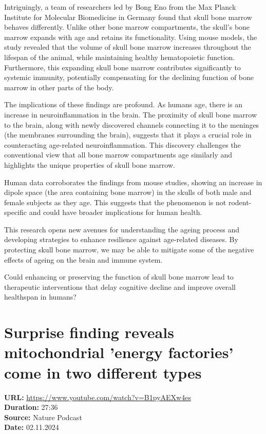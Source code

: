 \documentclass[12pt]{article}
\begin{document}
Intriguingly, a team of researchers led by Bong Eno from the Max Planck Institute for Molecular Biomedicine in Germany found that skull bone marrow behaves differently. Unlike other bone marrow compartments, the skull's bone marrow expands with age and retains its functionality. Using mouse models, the study revealed that the volume of skull bone marrow increases throughout the lifespan of the animal, while maintaining healthy hematopoietic function. Furthermore, this expanding skull bone marrow contributes significantly to systemic immunity, potentially compensating for the declining function of bone marrow in other parts of the body.

The implications of these findings are profound. As humans age, there is an increase in neuroinflammation in the brain. The proximity of skull bone marrow to the brain, along with newly discovered channels connecting it to the meninges (the membranes surrounding the brain), suggests that it plays a crucial role in counteracting age-related neuroinflammation. This discovery challenges the conventional view that all bone marrow compartments age similarly and highlights the unique properties of skull bone marrow.

Human data corroborates the findings from mouse studies, showing an increase in dipole space (the area containing bone marrow) in the skulls of both male and female subjects as they age. This suggests that the phenomenon is not rodent-specific and could have broader implications for human health.

This research opens new avenues for understanding the ageing process and developing strategies to enhance resilience against age-related diseases. By protecting skull bone marrow, we may be able to mitigate some of the negative effects of ageing on the brain and immune system.

Could enhancing or preserving the function of skull bone marrow lead to therapeutic interventions that delay cognitive decline and improve overall healthspan in humans?

\newpage

\section{Surprise finding reveals mitochondrial 'energy factories' come in two different types}
\textbf{URL:} \url{https://www.youtube.com/watch?v=B1pyAEXw4es}\\
\textbf{Duration:} 27:36\\
\textbf{Source:} Nature Podcast\\
\textbf{Date:} 02.11.2024
\end{document}
